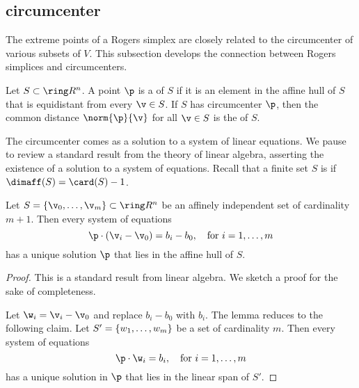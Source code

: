\begin{cnl}
\subsection{circumcenter}\label{circumcenter}

The extreme points of a Rogers simplex are closely related to the
circumcenter of various subsets of $V$.  This subsection develops the
connection between Rogers simplices and circumcenters.


\begin{definition}
\label{def:circumcenter}
%
Let $S\subset\vecR{n}$.  A point $\p$ is a  of
$S$ if it is an element in the affine hull of $S$ that is equidistant
from every $\v\in S$.  If $S$ has circumcenter $\p$, then the common
distance $\norm{\p}{\v}$ for all $\v\in S$ is the
 of $S$.
\end{definition}


The circumcenter comes as a solution to a system of linear equations.
We pause to review a standard result from the theory of linear
algebra, asserting the existence of a solution to a system of
equations.  Recall that a finite set $S$ is 
if $\dimaff(S) = \card(S) -1$.  
%
%


\begin{lemma}
\label{lemma:affine-system} 
%
Let $S=\setenumdots{\v}{0}{m}\subset \vecR{n}$ be an affinely
independent set of cardinality $m+1$.  Then every system of equations
\[  
\p \cdot (\v_i - \v_0) = b_i-b_0,\quad \text{for } \fordots{i}{1}{m}
\] 
has a unique solution  $\p$ that lies in the affine hull of $S$.
\end{lemma}


\begin{proof} This is a standard result from linear algebra.
We sketch a proof for the sake of completeness.  

Let $\w_i = \v_i-\v_0$ and replace $b_i-b_0$ with $b_i$.  
The lemma reduces to the following claim.
Let $S' = \{{w}_{1},\ldots,{w}_{m}\}$ be a  set
of cardinality $m$.  Then every system of equations
\[  
\p \cdot \w_i = b_i,\quad \text{for } \fordots{i}{1}{m}
\] 
has a unique solution in $\p$ that lies in the linear span of $S'$.


\end{proof}
\end{cnl}
